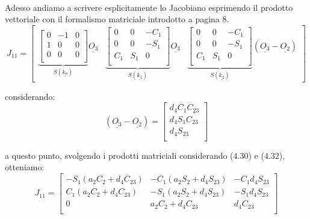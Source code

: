\paragraph{}
Adesso andiamo a scrivere esplicitamente lo Jacobiano esprimendo il prodotto vettoriale con il formalismo matriciale introdotto a pagina $8$.
\begin{equation*}
	J_{11} = 
	\begin{bmatrix}
		\underbrace{
		\begin{bmatrix}
			0 & -1 & 0 \\
			1 & 0 & 0 \\
			0 & 0 & 0 \\
		\end{bmatrix}
		}_{S(\underline{k_0})}
		\underline{O_3} & 
		\underbrace{
		\begin{bmatrix}
			0 & 0 & -C_1 \\
			0 & 0 & -S_1 \\
			C_1 & S_1 & 0 \\
		\end{bmatrix}
		}_{S(\underline{k_1})}
		\underline{O_3} &
		\underbrace{
		\begin{bmatrix}
		0 & 0 & -C_1 \\
		0 & 0 & -S_1 \\
		C_1 & S_1 & 0 \\
		\end{bmatrix}
		}_{S(\underline{k_2})}
		(\underline{O_3} - \underline{O_2})
	\end{bmatrix}
\end{equation*}

considerando:
\begin{equation}
	(\underline{O_3} - \underline{O_2}) = 
	\begin{bmatrix}
		d_4C_1C_{23} \\
		d_4S_1C_{23} \\
		d_4S_{23} \\
	\end{bmatrix}
\end{equation}

a questo punto, svolgendo i prodotti matriciali considerando ($4.30$) e ($4.32$), otteniamo:
\begin{equation}
	J_{11} = 
	\begin{bmatrix}
		-S_1(a_2C_2 + d_4C_{23}) & -C_1(a_2S_2 + d_4S_{23}) & -C_1d_4S_{23} \\
		C_1(a_2C_2 + d_4C_23) & -S_1(a_2S_2 + d_4S_{23}) & -S_1d_4S_{23} \\
		0 & a_2C_2 + d_4C_{23} & d_4C_{23} \\
	\end{bmatrix}
\end{equation}
